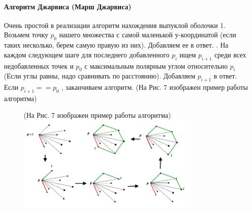 \paragraph*{Алгоритм Джарвиса (Марш Джарвиса)} Очень простой в реализации алгоритм нахождения выпуклой оболочки
\newline \newline
1. Возьмем точку $p_0$
нашего множества с самой маленькой $у$-координатой (если таких несколько, берем самую правую из них). Добавляем ее в ответ.  \newline{}. На каждом следующем шаге для последнего добавленного $p_i$
ищем $p_{i+1}$
среди всех недобавленных точек и $p_0$
с максимальным полярным углом относительно $p_i$
(Если углы равны, надо сравнивать по расстоянию). Добавляем $p_{i+1}$
в ответ. Если $p_{i+1}==p_0$
, заканчиваем алгоритм. (На Рис. 7 изображен пример работы алгоритма)
\begin{figure}[H] (На Рис. 7 изображен пример работы алгоритма)
    \centering
    \includegraphics[width = 9cm]{Jarvis.png}
    \caption{}
    \label{fig:float}
\end{figure}

